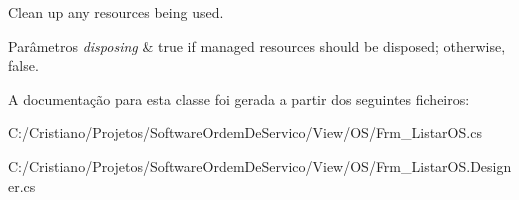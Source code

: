 Clean up any resources being used. 


\begin{DoxyParams}{Parâmetros}
{\em disposing} & true if managed resources should be disposed; otherwise, false.\\
\hline
\end{DoxyParams}


A documentação para esta classe foi gerada a partir dos seguintes ficheiros\+:\begin{DoxyCompactItemize}
\item 
C\+:/\+Cristiano/\+Projetos/\+Software\+Ordem\+De\+Servico/\+View/\+O\+S/Frm\+\_\+\+Listar\+O\+S.\+cs\item 
C\+:/\+Cristiano/\+Projetos/\+Software\+Ordem\+De\+Servico/\+View/\+O\+S/Frm\+\_\+\+Listar\+O\+S.\+Designer.\+cs\end{DoxyCompactItemize}
